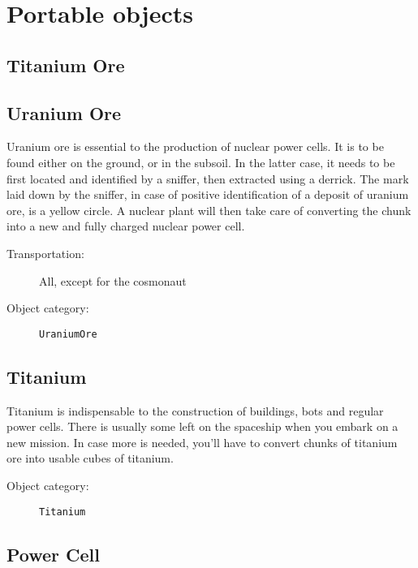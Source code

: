 \section{Portable objects}


\subsection{Titanium Ore}



\subsection{Uranium Ore}

Uranium ore is essential to the production of nuclear power cells. It is to be found either on the ground, or in the subsoil. In the latter case, it needs to be first located and identified by a sniffer, then extracted using a derrick. The mark laid down by the sniffer, in case of positive identification of a deposit of uranium ore, is a yellow circle. A nuclear plant will then take care of converting the chunk into a new and fully charged nuclear power cell.

\begin{description}
    \item[Transportation:] All, except for the cosmonaut
    \item[Object category:] \texttt{UraniumOre}
\end{description}


\subsection{Titanium}

Titanium is indispensable to the construction of buildings, bots and regular power cells. There is usually some left on the spaceship when you embark on a new mission. In case more is needed, you'll have to convert chunks of titanium ore into usable cubes of titanium.

\begin{description}
    \item[Object category:] \texttt{Titanium}
\end{description}


\subsection{Power Cell}


